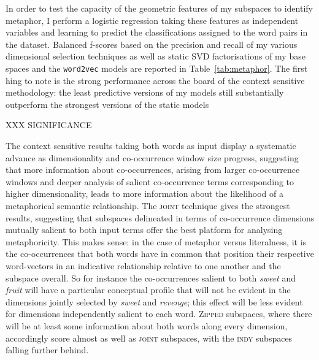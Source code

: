 In order to test the capacity of the geometric features of my subspaces to identify metaphor, I perform a logistic regression taking these features as independent variables and learning to predict the classifications assigned to the word pairs in the dataset.  Balanced f-scores based on the precision and recall of my various dimensional selection techniques as well as static SVD factorisations of my base spaces and the \texttt{word2vec} models are reported in Table~\ref{tab:metaphor}.  The first hing to note is the strong performance across the board of the context sensitive methodology: the least predictive versions of my models still substantially outperform the strongest versions of the static models

XXX SIGNIFICANCE

The context sensitive results taking both words as input display a systematic advance as dimensionality and co-occurrence window size progress, suggesting that more information about co-occurrences, arising from larger co-occurrence windows and deeper analysis of salient co-occurrence terms corresponding to higher dimensionality, leads to more information about the likelihood of a metaphorical semantic relationship.  The \textsc{joint} technique gives the strongest results, suggesting that subspaces delineated in terms of co-occurrence dimensions mutually salient to both input terms offer the best platform for analysing metaphoricity.  This makes sense: in the case of metaphor versus literalness, it is the co-occurrences that both words have in common that position their respective word-vectors in an indicative relationship relative to one another and the subspace overall.  So for instance the co-occurrences salient to both \emph{sweet} and \emph{fruit} will have a particular conceptual profile that will not be evident in the dimensions jointly selected by \emph{sweet} and \emph{revenge}; this effect will be less evident for dimensions independently salient to each word.  \textsc{Zipped} subspaces, where there will be at least some information about both words along every dimension, accordingly score almost as well as \textsc{joint} subspaces, with the \textsc{indy} subspaces falling further behind.

